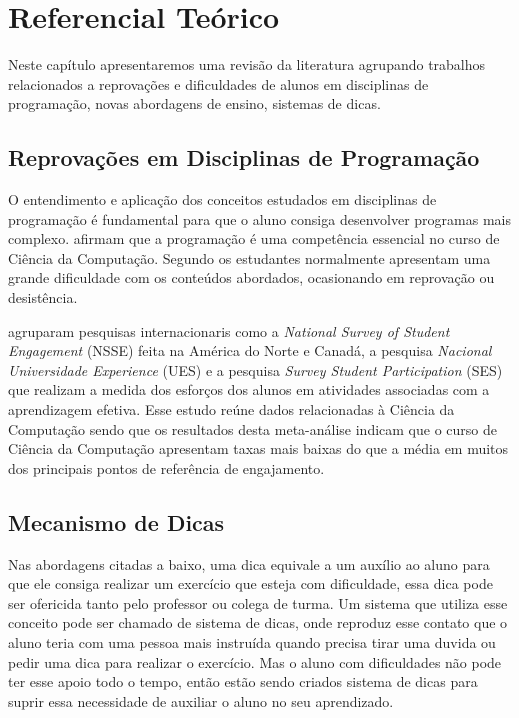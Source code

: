 \chapter{Referencial Teórico}

Neste capítulo apresentaremos uma revisão da literatura agrupando trabalhos relacionados a reprovações e dificuldades de alunos em disciplinas de programação, novas abordagens de ensino, sistemas de dicas. 

\section{Reprovações em Disciplinas de Programação}

O entendimento e aplicação dos conceitos estudados em disciplinas de programação é fundamental para que o aluno consiga desenvolver programas mais complexo.  afirmam que a programação é uma competência essencial no curso de Ciência da Computação. Segundo  os estudantes normalmente apresentam uma grande dificuldade com os conteúdos abordados, ocasionando em reprovação ou desistência.


 agruparam pesquisas internacionaris como a \textit{National Survey of Student Engagement} (NSSE) feita na América do Norte e Canadá, a pesquisa \textit{Nacional Universidade Experience} (UES) e a pesquisa \textit{Survey Student Participation} (SES) que realizam a medida dos esforços dos alunos em atividades associadas com a aprendizagem efetiva. Esse estudo reúne dados relacionadas à Ciência da Computação sendo que os resultados desta meta-análise indicam que o curso de Ciência da Computação apresentam taxas mais baixas do que a média em muitos dos principais pontos de referência de engajamento.

\section{Mecanismo de Dicas}


Nas abordagens citadas a baixo, uma dica equivale a um auxílio ao aluno para que ele consiga realizar um exercício que esteja com dificuldade, essa dica pode ser ofericida tanto pelo professor ou colega de turma. Um sistema que utiliza esse conceito pode ser chamado de sistema de dicas, onde reproduz esse contato que o aluno teria com uma pessoa mais instruída quando precisa tirar uma duvida ou pedir uma dica para realizar o exercício. Mas o aluno com dificuldades não pode ter esse apoio todo o tempo, então estão sendo criados sistema de dicas para suprir essa necessidade de auxiliar o aluno no seu aprendizado. 


